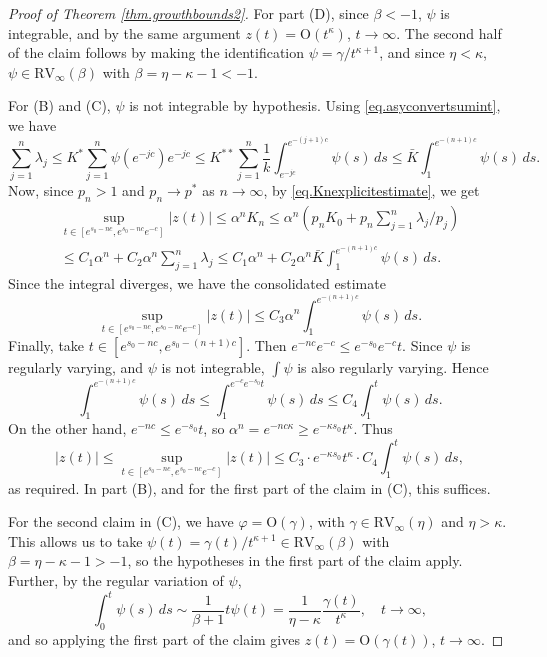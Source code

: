 \documentclass[a4paper,10pt,reqno]{amsart}
\numberwithin{equation}{section}
\theoremstyle{definition}
\theoremstyle{remark}
\DeclareMathOperator{\1}{\mathbbm 1}
\begin{document}
\begin{proof}[Proof of Theorem \ref{thm.growthbounds2}]
For part (D), since $\beta<-1$, $\psi$ is integrable, and by the same argument $z(t)=\text{O}(t^\kappa)$, $t\to\infty$. The second half of the claim follows by making the identification $\psi=\gamma/t^{\kappa+1}$, and since $\eta<\kappa$, $\psi\in \text{RV}_\infty(\beta)$ with $\beta=\eta-\kappa-1<-1$. 

For (B) and (C), $\psi$ is not integrable by hypothesis. Using \eqref{eq.asyconvertsumint}, we have  
\[
\sum_{j=1}^n \lambda_j \leq K^\ast \sum_{j=1}^n \psi(e^{-jc}) e^{-jc}
\leq K^{\ast \ast} \sum_{j=1}^n \frac{1}{k} \int_{e^{-jc}}^{e^{-(j+1)c}} \psi(s)\,ds
\leq \bar{K}  \int_{1}^{e^{-(n+1)c}} \psi(s)\,ds.
\]
Now, since $p_n>1$ and $p_n\to p^\ast$ as $n\to\infty$, by \eqref{eq.Knexplicitestimate}, we get 
\begin{multline*}
	\sup_{t\in [e^{s_0-nc},e^{s_0-nc}e^{-c}]}  |z(t)| \leq \alpha^n K_n
	\leq \alpha^n\left(p_n K_0 + p_n \sum_{j=1}^n \lambda_j/p_j\right)\\
	\leq C_1 \alpha^n + C_2 \alpha^n \sum_{j=1}^n \lambda_j
	\leq C_1 \alpha^n + C_2 \alpha^n \bar{K}  \int_{1}^{e^{-(n+1)c}} \psi(s)\,ds.
\end{multline*}
Since the integral diverges, we have the consolidated estimate
\[
\sup_{t\in [e^{s_0-nc},e^{s_0-nc}e^{-c}]}  |z(t)| \leq C_3 \alpha^n  \int_{1}^{e^{-(n+1)c}} \psi(s)\,ds.
\]
Finally, take $t\in [e^{s_0-nc},e^{s_0-(n+1)c}]$. Then $e^{-nc} e^{-c} \leq e^{-s_0}e^{-c}t$. Since $\psi$ is regularly varying, and $\psi$ is not integrable, $\int \psi$ is also regularly varying. Hence
\[
\int_1^{e^{-(n+1)c}} \psi(s)\,ds \leq \int_1^{e^{-c} e^{-s_0}t} \psi(s)\,ds
\leq C_4  \int_1^{t} \psi(s)\,ds.
\]
On the other hand, $e^{-nc}\leq  e^{-s_0} t$, so $\alpha^n=e^{-nc\kappa}\geq  e^{-\kappa s_0} t^\kappa$. Thus
\[
|z(t)|\leq 	\sup_{t\in [e^{s_0-nc},e^{s_0-nc}e^{-c}]}  |z(t)| \leq C_3 \cdot e^{-\kappa s_0} t^\kappa \cdot C_4  \int_1^{t} \psi(s)\,ds,
\]
as required. In part (B), and for the first part of the claim in (C), this suffices. 

For the second claim in (C), we have $\varphi=\text{O}(\gamma)$, with $\gamma\in \text{RV}_\infty(\eta)$ and $\eta>\kappa$. This allows us to take  $\psi(t)=\gamma(t)/t^{\kappa+1}\in \text{RV}_\infty(\beta)$ with $\beta=\eta-\kappa-1>-1$, so the hypotheses in the first part of the claim apply. Further, by the regular variation of $\psi$,
\[
\int_0^t \psi(s)\,ds \sim \frac{1}{\beta+1} t \psi(t) = \frac{1}{\eta-\kappa} \frac{\gamma(t)}{t^\kappa}, \quad t\to\infty,
\]  
and so applying the first part of the claim gives $z(t)=\text{O}(\gamma(t))$, $t\to\infty$. 


\end{proof}
\end{document}
